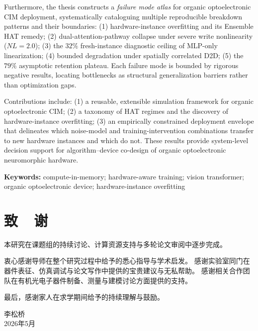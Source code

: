 Furthermore, the thesis constructs a \emph{failure mode atlas} for organic optoelectronic CIM deployment,
systematically cataloguing multiple reproducible breakdown patterns and their boundaries:
(1) hardware-instance overfitting and its Ensemble HAT remedy;
(2) dual-attention-pathway collapse under severe write nonlinearity ($NL=2.0$);
(3) the $32\%$ fresh-instance diagnostic ceiling of MLP-only linearization;
(4) bounded degradation under spatially correlated D2D;
(5) the $79\%$ asymptotic retention plateau.
Each failure mode is bounded by rigorous negative results, locating bottlenecks as structural generalization barriers rather than optimization gaps.

Contributions include:
(1) a reusable, extensible simulation framework for organic optoelectronic CIM;
(2) a taxonomy of HAT regimes and the discovery of hardware-instance overfitting;
(3) an empirically constrained deployment envelope that delineates which noise-model and training-intervention combinations transfer to new hardware instances and which do not.
These results provide system-level decision support for algorithm--device co-design of organic optoelectronic neuromorphic hardware.

\vspace{1em}
\noindent\textbf{Keywords:} compute-in-memory; hardware-aware training; vision transformer; organic optoelectronic device; hardware-instance overfitting

\vspace{2em}

\chapter*{致\ \ 谢}

本研究在课题组的持续讨论、计算资源支持与多轮论文审阅中逐步完成。

衷心感谢导师在整个研究过程中给予的悉心指导与学术启发。
感谢实验室同门在器件表征、仿真调试与论文写作中提供的宝贵建议与无私帮助。
感谢相关合作团队在有机光电子器件制备、测量与建模讨论方面提供的支持。

最后，感谢家人在求学期间给予的持续理解与鼓励。

\vspace{2em}
\noindent
{李松桥}\\
{2026年5月}
